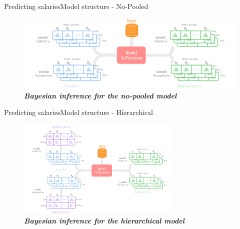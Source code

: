 \documentclass[aspectratio=169, xcolor=dvipsnames]{beamer}
\begin{document}
\begin{frame}{Predicting salaries}{Model structure - No-Pooled}
    \begin{figure}
        \centering
        \includegraphics[width=1.0\textwidth]{./images/no-pooled.png}
        \captionsetup{labelformat=empty}
        \setlength{\abovecaptionskip}{-5pt}
        \caption{\fontsize{8pt}{8pt}\selectfont \textbf{\textit{Bayesian inference for the no-pooled model}}}
    \end{figure}
\end{frame}

\begin{frame}{Predicting salaries}{Model structure - Hierarchical}
    \vspace*{-16pt}
    \begin{figure}
        \centering
        \includegraphics[width=0.7\textwidth]{./images/hierarchical.png}
        \captionsetup{labelformat=empty}
        \caption{\fontsize{8pt}{8pt}\selectfont \textbf{\textit{Bayesian inference for the hierarchical model}}}
    \end{figure}
\end{frame}
\end{document}
